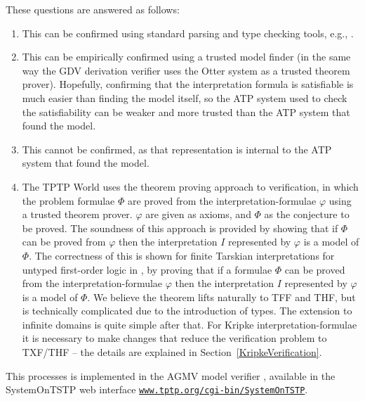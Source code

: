 \documentclass{easychair}
\begin{document}
These questions are answered as follows:
\begin{enumerate}
\item This can be confirmed using standard parsing and type checking tools, e.g., \cite{VS06,HR15}.
\item This can be empirically confirmed using a trusted model finder (in the same way the GDV 
      derivation verifier \cite{Sut06} uses the Otter system \cite{McC03-Otter} as a trusted 
      theorem prover).
      Hopefully, confirming that the interpretation formula is satisfiable is much easier than 
      finding the model itself, so the ATP system used to check the satisfiability can be weaker 
      and more trusted than the ATP system that found the model.
\item This cannot be confirmed, as that representation is internal to the ATP system that found
      the model.
\item The TPTP World uses the theorem proving approach to verification, in which the problem 
      formulae $\Phi$ are proved from the interpretation-formulae $\varphi$ using a trusted 
      theorem prover. 
      $\varphi$ are given as axioms, and $\Phi$ as the conjecture to be proved.
      The soundness of this approach is provided by showing that if $\Phi$ can be proved from 
      $\varphi$ then the interpretation $I$ represented by $\varphi$ is a model of $\Phi$.
      The correctness of this is shown for finite Tarskian interpretations for untyped 
      first-order logic in \cite{SS+23-LPAR}, by proving that if a formulae $\Phi$ can be 
      proved from the interpretation-formulae $\varphi$ then the interpretation $I$ 
      represented by $\varphi$ is a model of $\Phi$.
      We believe the theorem lifts naturally to TFF and THF, but is technically complicated 
      due to the introduction of types.
      The extension to infinite domains is quite simple after that.
      For Kripke interpretation-formulae it is necessary to make changes that reduce the
      verification problem to TXF/THF -- the details are explained in 
      Section~\ref{KripkeVerification}.
\end{enumerate}

This processes is implemented in the AGMV model verifier \cite{SS+23-LPAR}, available in the
SystemOnTSTP \cite{Sut07-CSR} web interface
\href{https://www.tptp.org/cgi-bin/SystemOnTSTP}{{\tt www.tptp.org/cgi-bin/SystemOnTSTP}}.
      
\end{document}
